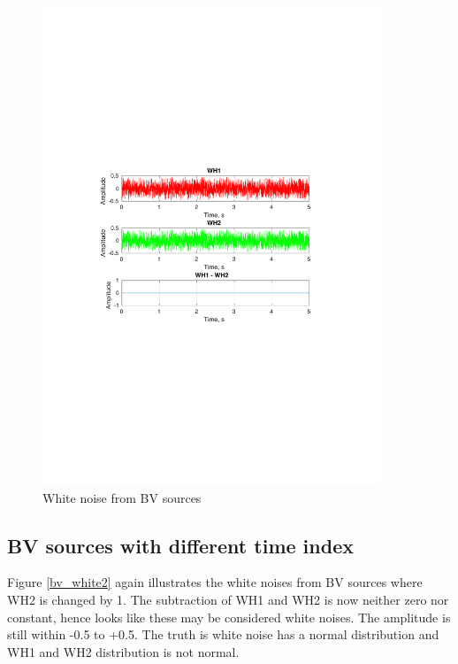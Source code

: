 \documentclass[12pt,a4paper,UKenglish]{article}
\begin{document}
\begin{figure} [H]
  \centering 
  \includegraphics[width=0.9\textwidth]{img/5a.pdf} 
  \caption{White noise from BV sources}
  \label{bv_white} 
\end{figure}
\subsection{BV sources with different time index}
 Figure \ref{bv_white2} again illustrates the white noises from BV sources where WH2 is changed by 1. The subtraction of WH1 and WH2 is now neither zero nor constant, hence looks like these may be considered white noises. The amplitude is still within -0.5 to +0.5. The truth is white noise has a normal distribution and WH1 and WH2 distribution is not normal. 
 
\end{document}
